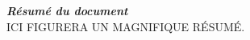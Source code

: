 \thispagestyle{empty}
\vspace*{10mm}

\textbf{\emph{\textcolor{epiBlue}{\large{Résumé du document} } } }\\

ICI FIGURERA UN MAGNIFIQUE RÉSUMÉ.

\clearpage
